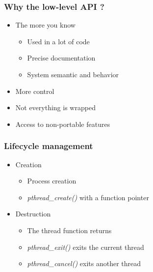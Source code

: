 \begin{frame}
  \frametitle{Why the low-level API ?}

  \begin{itemize}
  \item The more you know
    \begin{itemize}
    \item Used in a lot of code
    \item Precise documentation
    \item System semantic and behavior
    \end{itemize}
  \item More control
  \item Not everything is wrapped
  \item Access to non-portable features
  \end{itemize}
\end{frame}


\begin{frame}
  \frametitle{Lifecycle management}

  \begin{itemize}
  \item Creation
    \begin{itemize}
    \item Process creation
    \item \emph{pthread\_create()} with a function pointer
    \end{itemize}
  \item Destruction
    \begin{itemize}
    \item The thread function returns
    \item \emph{pthread\_exit()} exits the current thread
    \item \emph{pthread\_cancel()} exits another thread
    \end{itemize}
  \end{itemize}
\end{frame}




